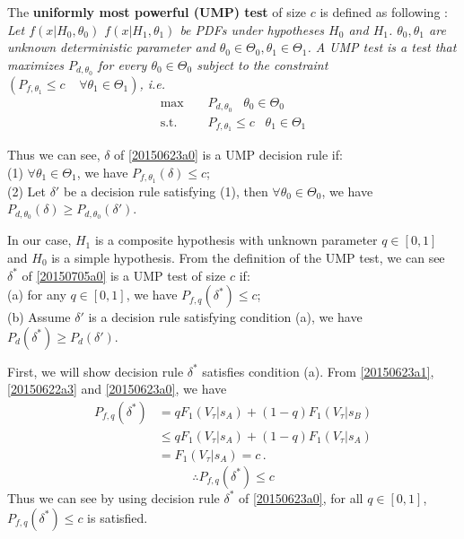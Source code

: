  The \textbf{uniformly most powerful (UMP) test} of size $c$ is defined as following \cite{LehmannTest, poor1994introduction, casella2002statistical}:
\textit{
  Let $f(x|H_0, \theta_0)$ $f(x|H_1, \theta_1)$ be PDFs under hypotheses $H_0$ and $H_1$. $\theta_0, \theta_1$ are unknown deterministic parameter and $\theta_0 \in \Theta_0, \theta_1 \in \Theta_1$. A UMP test is a test that maximizes $P_{d, \theta_0}$ for every  $\theta_0 \in \Theta_0$ subject to the constraint $(P_{f,\theta_1} \leq c\;\;\;\;\forall \theta_1 \in \Theta_1)$, i.e. }
\begin{equation}
  \begin{split}
    \max\;\;\;\;&P_{d, \theta_0}\;\;\;\theta_0 \in \Theta_0\\
    \text{s.t.}\;\;\;\;&P_{f, \theta_1} \leq c\;\;\;\theta_1 \in \Theta_1
  \end{split}
\end{equation}

Thus we can see,  $\delta$ of \eqref{20150623a0}  is a UMP decision rule if: 
  \\(1) $\forall \theta_1 \in \Theta_1$, we have $P_{f, \theta_1}(\delta) \leq c$;
  \\(2) Let $\delta'$ be a decision rule satisfying (1), then  $\forall \theta_0 \in \Theta_0$, we have $P_{d,\theta_0}(\delta) \geq P_{d, \theta_0}(\delta')$. 

  In our case, $H_1$ is a composite hypothesis with unknown parameter $q \in [0, 1]$ and $H_0$ is a simple hypothesis. From the definition of the UMP test,  we can see $\delta^\ast$ of \eqref{20150705a0} is a UMP test of size $c$ if:
\\(a) for any $q \in [0, 1]$, we have $P_{f,q}(\delta^\ast) \leq c$;
\\(b) Assume $\delta'$ is a decision rule satisfying condition (a), we have $P_d(\delta^\ast) \geq P_d(\delta')$.  

First, we will show decision rule $\delta^\ast$ satisfies condition (a). From \eqref{20150623a1}, \eqref{20150622a3} and \eqref{20150623a0}, we have 
\begin{equation}
  \begin{split}
    P_{f,q}(\delta^\ast) &= qF_1(V_\tau|s_A) + (1-q)F_1(V_\tau|s_B)\\
    &\leq qF_1(V_\tau|s_A) + (1-q)F_1(V_\tau|s_A)\\
    &= F_1(V_\tau|s_A) = c\,.
  \end{split}
\end{equation}
\begin{equation}
  \therefore P_{f,q}(\delta^\ast) \leq c
  \label{20150705a1}
\end{equation}
Thus we can see by using decision rule $\delta^\ast$ of \eqref{20150623a0}, for all $q \in [0, 1]$, $P_{f,q}(\delta^\ast) \leq c$ is satisfied.

